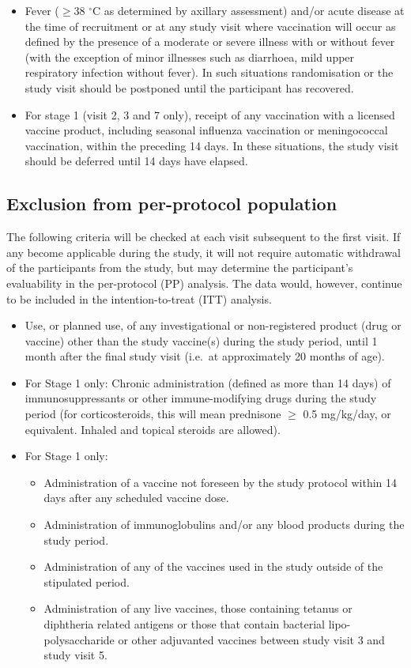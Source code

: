 \documentclass{bmcart}
\begin{document}
\begin{itemize}
	\item Fever ($\geq$38 $^{\circ}$C as determined by axillary assessment) and/or acute disease at the time of recruitment or at any study visit where vaccination will occur as defined by the presence of a moderate or severe illness with or without fever (with the exception of minor illnesses such as diarrhoea, mild upper respiratory infection without fever). In such situations randomisation or the study visit should be postponed until the participant has recovered.
	\item For stage 1 (visit 2, 3 and 7 only), receipt of any vaccination with a licensed vaccine product, including seasonal influenza vaccination or meningococcal vaccination, within the preceding 14 days. In these situations, the study visit should be deferred until 14 days have elapsed.
\end{itemize}

\subsection*{Exclusion from per-protocol population}

The following criteria will be checked at each visit subsequent to the first visit.
If any become applicable during the study, it will not require automatic withdrawal of the participants from the study, but may determine the participant's evaluability in the per-protocol (PP) analysis.
The data would, however, continue to be included in the intention-to-treat (ITT) analysis.

\begin{itemize}
	\item Use, or planned use, of any investigational or non-registered product (drug or vaccine) other than the study vaccine(s) during the study period, until 1 month after the final study visit (i.e.~at approximately 20 months of age).
	\item For Stage 1 only: Chronic administration (defined as more than 14 days) of immunosuppressants or other immune-modifying drugs during the study period (for corticosteroids, this will mean prednisone $\geq$ 0.5 mg/kg/day, or equivalent. Inhaled and topical steroids are allowed).
	\item For Stage 1 only:
	
	\begin{itemize}
		\item Administration of a vaccine not foreseen by the study protocol within 14 days after any scheduled vaccine dose.
		\item Administration of immunoglobulins and/or any blood products during the study period.
		\item Administration of any of the vaccines used in the study outside of the stipulated period.
		\item Administration of any live vaccines, those containing tetanus or diphtheria related antigens or those that contain bacterial lipo-polysaccharide or other adjuvanted vaccines between study visit 3 and study visit 5.
	\end{itemize}
\end{itemize}
\end{document}
